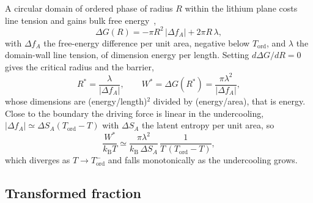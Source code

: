 \documentclass[reprint,twocolumn,prb,amsmath,amssymb,superscriptaddress,floatfix]{revtex4-2}
\newcommand{\kB}{k_{\mathrm{B}}}
\newcommand{\Tcol}{T_{\mathrm{ord}}}
\begin{document}
A circular domain of ordered phase of radius $R$ within the lithium plane costs line tension and
gains bulk free energy~\cite{Turnbull1949,Turnbull1950},
\begin{equation}
  \Delta G(R) = -\pi R^{2}\,|\Delta f_{A}| + 2\pi R\,\lambda ,
  \label{eq:sm-dg}
\end{equation}
with $\Delta f_{A}$ the free-energy difference per unit area, negative below $\Tcol$, and
$\lambda$ the domain-wall line tension, of dimension energy per length. Setting
$d\Delta G/dR=0$ gives the critical radius and the barrier,
\begin{equation}
  R^{*}=\frac{\lambda}{|\Delta f_{A}|},
  \qquad
  W^{*}=\Delta G(R^{*})=\frac{\pi\lambda^{2}}{|\Delta f_{A}|},
  \label{eq:sm-wstar}
\end{equation}
whose dimensions are (energy/length)$^{2}$ divided by (energy/area), that is energy. Close to
the boundary the driving force is linear in the undercooling,
$|\Delta f_{A}|\simeq\Delta S_{A}(\Tcol-T)$ with $\Delta S_{A}$ the latent entropy per unit
area, so
\begin{equation}
  \frac{W^{*}}{\kB T}\simeq\frac{\pi\lambda^{2}}{\kB\,\Delta S_{A}}\,
  \frac{1}{T\,(\Tcol-T)},
  \label{eq:sm-wkt}
\end{equation}
which diverges as $T\to\Tcol^{-}$ and falls monotonically as the undercooling grows.

\subsection{Transformed fraction}
\end{document}
